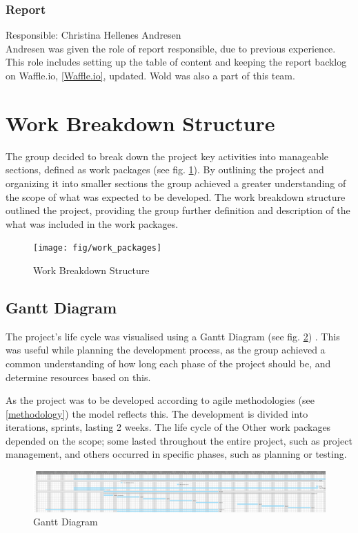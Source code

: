 \subsubsection{Report}
Responsible: Christina Hellenes Andresen\\
Andresen was given the role of report responsible, due to previous experience. This role includes setting up the table of content and keeping the report backlog on Waffle.io, \ref{Waffle.io}, updated. Wold was also a part of this team.


\section{Work Breakdown Structure}
The group decided to break down the project key activities into manageable sections, defined as work packages (see fig. \ref{Work_Breakdown_Structure}). By outlining the project and organizing it into smaller sections the group achieved a greater understanding of the scope of what was expected to be developed. The work breakdown structure outlined the project, providing the group further definition and description of the what was included in the work packages. 

\begin{figure}[h!]
\centering
    \texttt{[image: fig/work\_packages]}
\caption{Work Breakdown Structure}
\label{Work_Breakdown_Structure}
\end{figure}

\subsection{Gantt Diagram} 
The project's life cycle was visualised using a Gantt Diagram (see fig. \ref{Gantt_Diagram}) . This was useful while planning the development process, as the group achieved a common understanding of how long each phase of the project should be, and determine resources based on this. 

As the project was to be developed according to agile methodologies (see \ref{methodology}) the model reflects this. The development is divided into iterations, sprints, lasting 2 weeks. The life cycle of the Other work packages depended on the scope; some lasted throughout the entire project, such as project management, and others occurred in specific phases, such as planning or testing. 

\begin{figure}[h!]
\centering
    \includegraphics[width=1.0\textwidth]{fig/gantt}
\caption{Gantt Diagram}
\label{Gantt_Diagram}
\end{figure}


